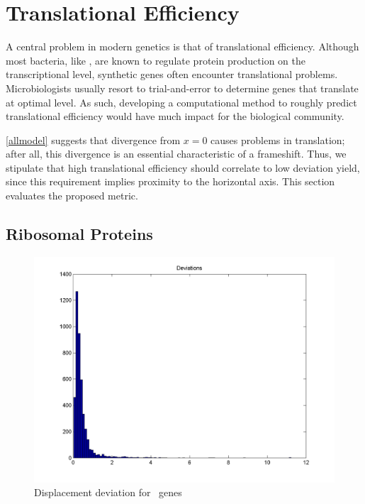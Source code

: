 \documentclass[12pt, draft]{article}
\numberwithin{equation}{section}
\begin{document}
\section{Translational Efficiency}


A central problem in modern genetics is that of translational efficiency.
Although most bacteria, like \ecoli, are known to regulate protein production
on the transcriptional level, synthetic genes often encounter translational
problems.  Microbiologists usually resort to trial-and-error to determine genes
that translate at optimal level.  As such, developing a computational method
to roughly predict translational efficiency would have much impact for the 
biological community.

\autoref{allmodel} suggests that divergence from $x=0$ causes
problems in translation; after all, this divergence is an essential characteristic
of a frameshift.  Thus, we stipulate that high translational efficiency should correlate to low deviation yield,
since this requirement implies proximity to the horizontal axis.  This section
evaluates the proposed metric.

\subsection{Ribosomal Proteins}


\begin{figure}
  \centering
  \caption{Displacement deviation for \ecoli\ genes}
  \label{ecoli:hist}
  \includegraphics[scale=0.2]{histograms/everything}
\end{figure}
\end{document}
